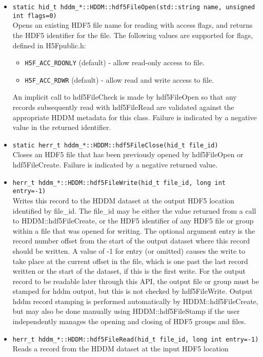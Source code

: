 \documentclass{revtex4}
\begin{document}
\begin{itemize}
\item \texttt{static hid\_t hddm\_*::HDDM::hdf5FileOpen(std::string name, unsigned int flags=0)}\\
Opens an existing HDF5 file name for reading with access flags, and returns
the HDF5 identifier for the file. The following values are supported for 
flags, defined in H5Fpublic.h:
\begin{itemize}
\item \texttt{H5F\_ACC\_RDONLY} (default) - allow read-only access to file.
\item \texttt{H5F\_ACC\_RDWR} (default) - allow read and write access to file.
\end{itemize}
An implicit call to hdf5FileCheck is made by hdf5FileOpen so that any 
records subsequently read with hdf5FileRead are validated against the
appropriate HDDM metadata for this class. Failure is indicated by a
negative value in the returned identifier.
\item \texttt{static herr\_t hddm\_*::HDDM::hdf5FileClose(hid\_t file\_id)}\\
Closes an HDF5 file that has been previously opened by hdf5FileOpen
or hdf5FileCreate. Failure is indicated by a negative returned value.
\item \texttt{herr\_t hddm\_*::HDDM::hdf5FileWrite(hid\_t file\_id, long int entry=-1)}\\
Writes this record to the HDDM dataset at the output HDF5 location
identified by file\_id. The file\_id may be either the value returned from 
a call to HDDM::hdf5FileCreate, or the HDF5 identifier of any HDF5 file or
group within a file that was opened for writing. The optional argument entry
is the record number offset from the start of the output dataset where this
record should be written. A value of -1 for entry (or omitted) causes the 
write to take place at the current offset in the file, which is one past 
the last record written or the start of the dataset, if this is the first
write. For the output record to be readable later through this API, the
output file or group must be stamped for hddm output, but this is not
checked by hdf5FileWrite. Output hddm record stamping is performed
automatically by HDDM::hdf5FileCreate, but may also be done manually 
using HDDM::hdf5FileStamp if the user independently manages the opening
and closing of HDF5 groups and files. 
\item \texttt{herr\_t hddm\_*::HDDM::hdf5FileRead(hid\_t file\_id, long int entry=-1)}\\
Reads a record from the HDDM dataset at the input HDF5 location 

\end{itemize}
\end{document}
